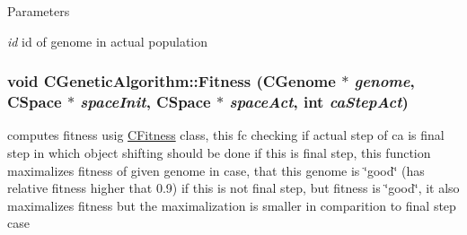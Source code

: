 \begin{DoxyParams}{Parameters}
\item[{\em id}]id of genome in actual population \end{DoxyParams}
\hypertarget{classCGeneticAlgorithm_a354d08a200d57940cfabf5b935b2809c}{
\subsubsection[{Fitness}]{\setlength{\rightskip}{0pt plus 5cm}void CGeneticAlgorithm::Fitness ({\bf CGenome} $\ast$ {\em genome}, \/  {\bf CSpace} $\ast$ {\em spaceInit}, \/  {\bf CSpace} $\ast$ {\em spaceAct}, \/  int {\em caStepAct})}}
\label{classCGeneticAlgorithm_a354d08a200d57940cfabf5b935b2809c}
computes fitness usig \hyperlink{classCFitness}{CFitness} class, this fc checking if actual step of ca is final step in which object shifting should be done if this is final step, this function maximalizes fitness of given genome in case, that this genome is \char`\"{}good\char`\"{} (has relative fitness higher that 0.9) if this is not final step, but fitness is \char`\"{}good\char`\"{}, it also maximalizes fitness but the maximalization is smaller in comparition to final step case


